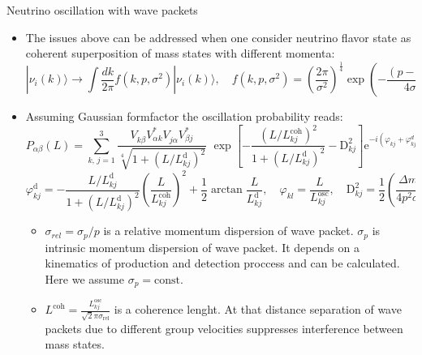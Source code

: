 \documentclass[usenames, dvipsnames]{beamer}
\newcommand{\Lcoh}{\ensuremath{L^{\text{coh}}}}
\newcommand{\Important}{\textcolor{BrickRed}}
\begin{document}
\begin{frame}[fragile]
\begin{columns}[T]
\begin{column}{.5\textwidth}
\begin{block}{Neutrino oscillation with wave packets}
  \begin{itemize}
      \item The issues above can be addressed when one consider neutrino
          flavor state as coherent superposition of mass states with different
          momenta:
          \begin{equation*}
           |\nu_i(k)\rangle \rightarrow  \int \frac{dk}{2\pi} f(k, p,
           \sigma^2) | \nu_i(k) \rangle, \quad f(k, p, \sigma^2) = \left(
           \frac{2\pi}{\sigma^2}\right)^{\frac{1}{4}}
           \exp\left(-\dfrac{(p-k)^2}{4\sigma^2}\right)
          \end{equation*}
    \item Assuming Gaussian formfactor the oscillation probability reads: 
        \begin{equation*}
P_{\alpha\beta}(L) = \sum_{k,\,j=1}^3\frac{ V^{\phantom\dagger}_{k \beta }V^*_{\alpha k}V^{\phantom\dagger}_{j \alpha }  V^*_{\beta j} }{\sqrt[4]{1 +
    \left(L/L^{\text{d}}_{kj}\right)^2}}\,\,
    \exp{\left[- \frac{\left(L/L^\text{coh}_{kj}\right)^2}{1+\left(L/L^{\text{d}}_{kj}\right)^2} -\mathrm{D}^2_{kj}\right]}
    \text{e}^{-i(\varphi_{kj} + \varphi^d_{kj})}
    \end{equation*} 
    \begin{equation*}
    \varphi^\text{d}_{kj} =
    - \frac {L/L^\text{d}_{kj}}{1+\left(L/{L^\text{d}_{kj}}\right)^2}
      \left(\frac L {L^\text{coh}_{kj}}\right)^2
    + \frac{1}{2} \arctan { \frac{L}{L^\text{d}_{kj}}}
    ,\quad \varphi_{kl}=\frac{L}{L^\text{osc}_{kj}}, \quad
    \text{D}^2_{kj} =\frac{1}{2} \left( \frac{\Delta m^2_{kj}}{4 p^2\sigma_\text{rel}} \right)^2 
    \end{equation*}
    \begin{itemize}
        \item \Important{$\sigma_{rel}=\sigma_{p}/p$} is a relative
            momentum dispersion of wave packet. \newline
            \Important{\ensuremath{\sigma_p}} is intrinsic
    momentum dispersion of wave packet. It depends on a kinematics of
    production and detection proccess and can be calculated. Here we assume
    \ensuremath{\sigma_p = \text{const}}.
\item \Important{$\Lcoh = \frac{L^\text{osc}_{kj}}{\sqrt 2 
    \pi\sigma_\text{rel}}$} is a \Important{coherence lenght}.
            At that distance separation of wave packets due to different group
            velocities suppresses interference between mass states.

\end{itemize}
\end{itemize}
\end{block}
\end{column}
\end{columns}
\end{frame}
\end{document}
